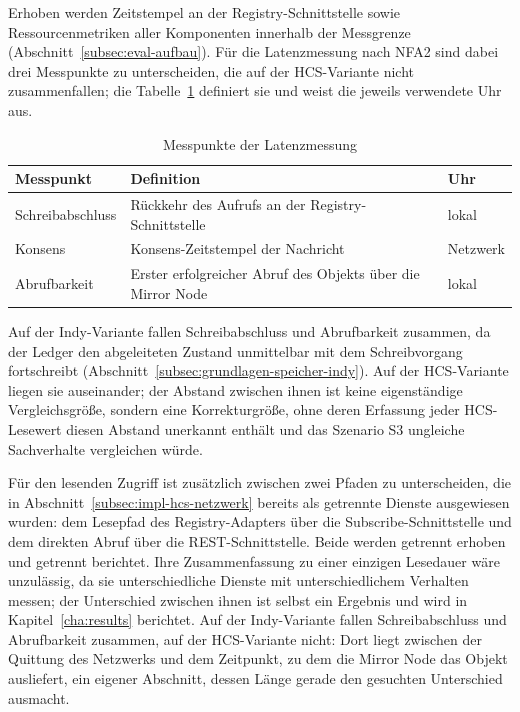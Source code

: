 Erhoben werden Zeitstempel an der Registry-Schnittstelle sowie Ressourcenmetriken aller Komponenten innerhalb der Messgrenze (Abschnitt~\ref{subsec:eval-aufbau}). Für die Latenzmessung nach NFA2 sind dabei drei Messpunkte zu unterscheiden, die auf der HCS-Variante nicht zusammenfallen; die Tabelle~\ref{tab:impl-messpunkte} definiert sie und weist die jeweils verwendete Uhr aus.

\begin{table}[htbp]
\renewcommand{\arraystretch}{1.3}
\footnotesize
  \centering
  \caption{Messpunkte der Latenzmessung}
  \label{tab:impl-messpunkte}
  \begin{tabular}{p{} p{} p{}}
    \toprule
    \textbf{Messpunkt} & \textbf{Definition} & \textbf{Uhr} \\
    \midrule
    Schreibabschluss & Rückkehr des Aufrufs an der Registry-Schnittstelle & lokal \\
    Konsens & Konsens-Zeitstempel der Nachricht & Netzwerk \\
    Abrufbarkeit & Erster erfolgreicher Abruf des Objekts über die Mirror Node & lokal \\
    \bottomrule
  \end{tabular}
\end{table}

Auf der Indy-Variante fallen Schreibabschluss und Abrufbarkeit zusammen, da der Ledger den abgeleiteten Zustand unmittelbar mit dem Schreibvorgang fortschreibt (Abschnitt~\ref{subsec:grundlagen-speicher-indy}). Auf der HCS-Variante liegen sie auseinander; der Abstand zwischen ihnen ist keine eigenständige Vergleichsgröße, sondern eine Korrekturgröße, ohne deren Erfassung jeder HCS-Lesewert diesen Abstand unerkannt enthält und das Szenario S3 ungleiche Sachverhalte vergleichen würde.

Für den lesenden Zugriff ist zusätzlich zwischen zwei Pfaden zu unterscheiden, die in Abschnitt~\ref{subsec:impl-hcs-netzwerk} bereits als getrennte Dienste ausgewiesen wurden: dem Lesepfad des Registry-Adapters über die Subscribe-Schnittstelle und dem direkten Abruf über die REST-Schnittstelle. Beide werden getrennt erhoben und getrennt berichtet. Ihre Zusammenfassung zu einer einzigen Lesedauer wäre unzulässig, da sie unterschiedliche Dienste mit unterschiedlichem Verhalten messen; der Unterschied zwischen ihnen ist selbst ein Ergebnis und wird in Kapitel~\ref{cha:results} berichtet. Auf der Indy-Variante fallen Schreibabschluss und Abrufbarkeit zusammen, auf der HCS-Variante nicht: Dort liegt zwischen der Quittung des Netzwerks und dem Zeitpunkt, zu dem die Mirror Node das Objekt ausliefert, ein eigener Abschnitt, dessen Länge gerade den gesuchten Unterschied ausmacht.

